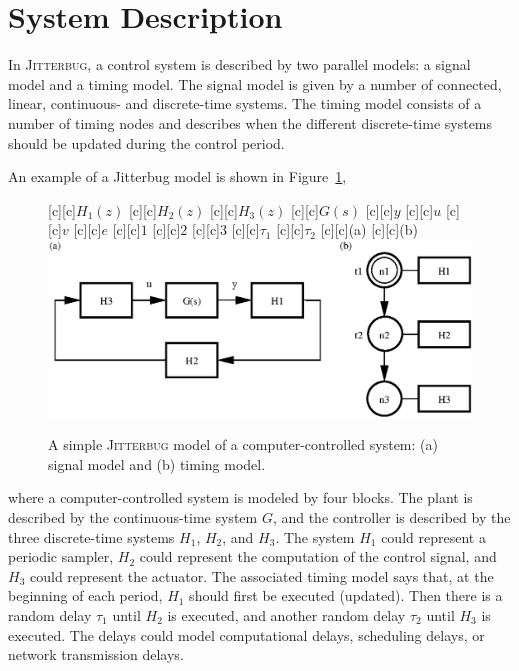 \documentclass[final,twoside]{rapport}  %
\begin{document}
\section{System Description}

In \textsc{Jitterbug}, a control system is described by two parallel
models: a signal model and a timing model. The signal model is
given by a number of connected, linear, continuous- and
discrete-time systems. The timing model consists of a number of
timing nodes and describes when the different discrete-time systems
should be updated during the control period.

An example of a {\sc Jitterbug} model is shown in
Figure~\ref{fig:example1},
\begin{figure}[bp]
  \centerline{
  [c][c]{$H_1(z)$}
  [c][c]{$H_2(z)$}
  [c][c]{$H_3(z)$}
  [c][c]{$G(s)$}
  [c][c]{$y$}
  [c][c]{$u$}
  [c][c]{$v$}
  [c][c]{$e$}
  [c][c]{$1$}
  [c][c]{$2$}
  [c][c]{$3$}
  [c][c]{$\tau_1$}
  [c][c]{$\tau_2$}
  [c][c]{\small (a)}
  [c][c]{\small (b)}
  \includegraphics[scale=0.63]{example1.eps}
  }
  \caption{A simple \textsc{Jitterbug} model of a computer-controlled system:
    (a) signal model and (b) timing model.}
  \label{fig:example1}
\end{figure}
where a computer-controlled system is
modeled by four blocks. The plant is described by the continuous-time
system $G$, and the controller is described by the three discrete-time
systems $H_1$, $H_2$, and $H_3$. The system $H_1$ could represent a
periodic sampler, $H_2$ could represent the computation of 
the control signal, and $H_3$ could represent the actuator. The
associated timing model says that, at the beginning of each period,
$H_1$ should first be executed (updated). Then there is a random delay
$\tau_1$ until $H_2$ is executed, and another random delay $\tau_2$
until $H_3$ is executed. The delays could model computational delays,
scheduling delays, or network transmission delays.
\end{document}
